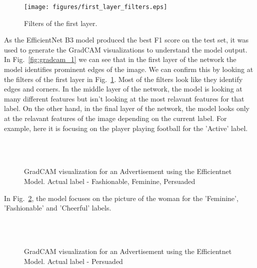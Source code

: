 \documentclass[conference]{IEEEtran}
\begin{document}
  \begin{figure}[htbp]
    \centering
    \texttt{[image: figures/first\_layer\_filters.eps]}  
     \caption{Filters of the first layer.}
     \label{fig:filters}
  \end{figure}



As the EfficientNet B3 model produced the best F1 score on the test set, it was used 
to generate the GradCAM visualizations to understand the model output. 
In Fig.~\ref{fig:gradcam_1} we can see that in the first layer of the network the model 
identifies prominent edges of the image. We can confirm this by looking at the filters of the 
first layer in Fig.~\ref{fig:filters}. Most of the filters look like they identify edges 
and corners. In the middle layer of the network, the model is looking at many different features 
but isn't looking at the most relavant features for that label. On the other hand, in the 
final layer of the network, the model looks only at the relavant features of the image 
depending on the current label. For example, here it is focusing on the player playing football
for the 'Active' label. 

\begin{figure}
    
    \\
    \\
    \caption{GradCAM visualization for an Advertisement using the Efficientnet Model. Actual label - Fashionable, Feminine, Persuaded}
    \label{fig:gradcam_2}
  \end{figure}

In Fig.~\ref{fig:gradcam_2}, the model focuses on the picture of the 
woman for the 'Feminine', 'Fashionable' and 'Cheerful' labels.

\begin{figure}
    
    \\
    \\
    \caption{GradCAM visualization for an Advertisement using the Efficientnet Model. Actual label - Persuaded}
    \label{fig:gradcam_9}
  \end{figure}
\end{document}
